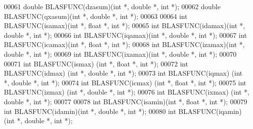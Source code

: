 \begin{DoxyCode}
00061 \textcolor{keywordtype}{double} BLASFUNC(dzasum)(\textcolor{keywordtype}{int} *, \textcolor{keywordtype}{double} *, \textcolor{keywordtype}{int} *);
00062 \textcolor{keywordtype}{double} BLASFUNC(qxasum)(\textcolor{keywordtype}{int} *, \textcolor{keywordtype}{double} *, \textcolor{keywordtype}{int} *);
00063 
00064 \textcolor{keywordtype}{int}    BLASFUNC(isamax)(\textcolor{keywordtype}{int} *, \textcolor{keywordtype}{float}  *, \textcolor{keywordtype}{int} *);
00065 \textcolor{keywordtype}{int}    BLASFUNC(idamax)(\textcolor{keywordtype}{int} *, \textcolor{keywordtype}{double} *, \textcolor{keywordtype}{int} *);
00066 \textcolor{keywordtype}{int}    BLASFUNC(iqamax)(\textcolor{keywordtype}{int} *, \textcolor{keywordtype}{double} *, \textcolor{keywordtype}{int} *);
00067 \textcolor{keywordtype}{int}    BLASFUNC(icamax)(\textcolor{keywordtype}{int} *, \textcolor{keywordtype}{float}  *, \textcolor{keywordtype}{int} *);
00068 \textcolor{keywordtype}{int}    BLASFUNC(izamax)(\textcolor{keywordtype}{int} *, \textcolor{keywordtype}{double} *, \textcolor{keywordtype}{int} *);
00069 \textcolor{keywordtype}{int}    BLASFUNC(ixamax)(\textcolor{keywordtype}{int} *, \textcolor{keywordtype}{double} *, \textcolor{keywordtype}{int} *);
00070 
00071 \textcolor{keywordtype}{int}    BLASFUNC(ismax) (\textcolor{keywordtype}{int} *, \textcolor{keywordtype}{float}  *, \textcolor{keywordtype}{int} *);
00072 \textcolor{keywordtype}{int}    BLASFUNC(idmax) (\textcolor{keywordtype}{int} *, \textcolor{keywordtype}{double} *, \textcolor{keywordtype}{int} *);
00073 \textcolor{keywordtype}{int}    BLASFUNC(iqmax) (\textcolor{keywordtype}{int} *, \textcolor{keywordtype}{double} *, \textcolor{keywordtype}{int} *);
00074 \textcolor{keywordtype}{int}    BLASFUNC(icmax) (\textcolor{keywordtype}{int} *, \textcolor{keywordtype}{float}  *, \textcolor{keywordtype}{int} *);
00075 \textcolor{keywordtype}{int}    BLASFUNC(izmax) (\textcolor{keywordtype}{int} *, \textcolor{keywordtype}{double} *, \textcolor{keywordtype}{int} *);
00076 \textcolor{keywordtype}{int}    BLASFUNC(ixmax) (\textcolor{keywordtype}{int} *, \textcolor{keywordtype}{double} *, \textcolor{keywordtype}{int} *);
00077 
00078 \textcolor{keywordtype}{int}    BLASFUNC(isamin)(\textcolor{keywordtype}{int} *, \textcolor{keywordtype}{float}  *, \textcolor{keywordtype}{int} *);
00079 \textcolor{keywordtype}{int}    BLASFUNC(idamin)(\textcolor{keywordtype}{int} *, \textcolor{keywordtype}{double} *, \textcolor{keywordtype}{int} *);
00080 \textcolor{keywordtype}{int}    BLASFUNC(iqamin)(\textcolor{keywordtype}{int} *, \textcolor{keywordtype}{double} *, \textcolor{keywordtype}{int} *);

\end{DoxyCode}
